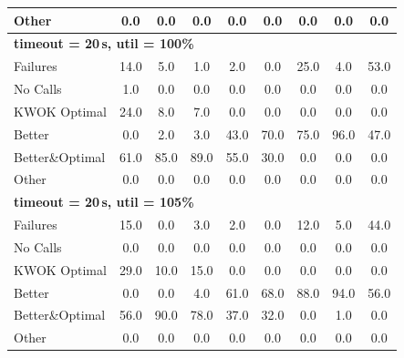 \begin{tabular}{l cccccccc}
Other & 0.0 & 0.0 & 0.0 & 0.0 & 0.0 & 0.0 & 0.0 & 0.0 \\
\midrule
\multicolumn{9}{l}{\textbf{timeout = 20\,s, util = 100\%}} \\
\midrule
Failures & 14.0 & 5.0 & 1.0 & 2.0 & 0.0 & 25.0 & 4.0 & 53.0 \\
No Calls & 1.0 & 0.0 & 0.0 & 0.0 & 0.0 & 0.0 & 0.0 & 0.0 \\
KWOK Optimal & 24.0 & 8.0 & 7.0 & 0.0 & 0.0 & 0.0 & 0.0 & 0.0 \\
Better & 0.0 & 2.0 & 3.0 & 43.0 & 70.0 & 75.0 & 96.0 & 47.0 \\
Better\&Optimal & 61.0 & 85.0 & 89.0 & 55.0 & 30.0 & 0.0 & 0.0 & 0.0 \\
Other & 0.0 & 0.0 & 0.0 & 0.0 & 0.0 & 0.0 & 0.0 & 0.0 \\
\midrule
\multicolumn{9}{l}{\textbf{timeout = 20\,s, util = 105\%}} \\
\midrule
Failures & 15.0 & 0.0 & 3.0 & 2.0 & 0.0 & 12.0 & 5.0 & 44.0 \\
No Calls & 0.0 & 0.0 & 0.0 & 0.0 & 0.0 & 0.0 & 0.0 & 0.0 \\
KWOK Optimal & 29.0 & 10.0 & 15.0 & 0.0 & 0.0 & 0.0 & 0.0 & 0.0 \\
Better & 0.0 & 0.0 & 4.0 & 61.0 & 68.0 & 88.0 & 94.0 & 56.0 \\
Better\&Optimal & 56.0 & 90.0 & 78.0 & 37.0 & 32.0 & 0.0 & 1.0 & 0.0 \\
Other & 0.0 & 0.0 & 0.0 & 0.0 & 0.0 & 0.0 & 0.0 & 0.0 \\
\bottomrule
\end{tabular}
